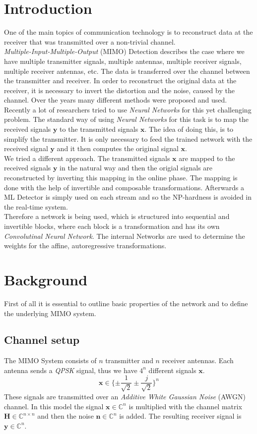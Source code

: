 \documentclass[oneside]{msvreport}%
\newcommand{\B}[1]{\boldsymbol{#1}}
\newcommand{\e}[1]{\emph{#1}}
\begin{document}
\chapter{Introduction}
One of the main topics of communication technology is to reconstruct data at the receiver that was transmitted over a non-trivial channel.\\ \emph{Multiple-Input-Multiple-Output} (MIMO) Detection describes the case where we have multiple transmitter signals, multiple antennas, multiple receiver signals, multiple receiver antennas, etc. The data is transferred over the channel between the transmitter and receiver. In order to reconstruct the original data at the receiver, it is necessary to invert the distortion and the noise, caused by the channel. Over the years many different methods were proposed and used. Recently a lot of researchers tried to use \emph{Neural Networks} for this yet challenging problem. The standard way of using \emph{Neural Networks} for this task is to map the received signals $\B{y}$ to the transmitted signals $\B{x}$. The idea of doing this, is to simplify the transmitter. It is only necessary to feed the trained network with the received signal $\B{y}$ and it then computes the original signal $\B{x}$.\\ We tried a different approach. The transmitted signals $\B{x}$ are mapped to the received signals $\B{y}$ in the natural way and then the origial signals are reconstructed by inverting this mapping in the online phase. The mapping is done with the help of invertible and composable transformations. Afterwards a ML Detector is simply used on each stream and so the NP-hardness is avoided in the real-time system.\\Therefore a network is being used, which is structured into sequential and invertible blocks, where each block is a transformation and has its own \emph{Convolutinal Neural Network}. The internal Networks are used to determine the weights for the affine, autoregressive transformations.


\chapter{Background}
First of all it is essential to outline basic properties of the network and to define the underlying MIMO system.
\section{Channel setup}
The MIMO System consists of $n$ transmitter and $n$ receiver antennas. Each antenna sends a \e{QPSK} signal, thus we have $4^n$ different signals $\B{x}$. 
\begin{equation}
	\B{x} \in \{ \pm \frac{1}{\sqrt{2}} \pm \frac{j}{\sqrt{2}} \}^n
\end{equation}
These signals are transmitted over an \emph{Additive White Gaussian Noise} (AWGN) channel. In this model the signal $\B{x} \in \mathbb{C}^n$ is multiplied with the channel matrix $\B{H} \in \mathbb{C}^{n \times n}$ and then the noise $\B{n} \in \mathbb{C}^n$ is added. The resulting receiver signal is $\B{y} \in \mathbb{C}^n$.
\end{document}
